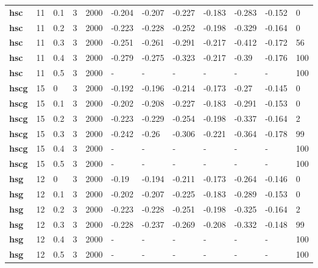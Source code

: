 \begin{longtable}[h]{|p{0.8cm}|p{1.5cm}|p{1cm}|p{1cm}|p{1cm}|p{1cm}|p{1cm}|p{1cm}|p{1cm}|p{1cm}|p{1cm}|p{1.5cm}|}
           \\
  \textbf{hsc } &  11         & 0.1 & 3 & 2000 & -0.204 & -0.207 & -0.227 & -0.183 & -0.283 & -0.152 &   0
           \\
  \textbf{hsc } &  11         & 0.2 & 3 & 2000 & -0.223 & -0.228 & -0.252 & -0.198 & -0.329 & -0.164 &   0
           \\
  \textbf{hsc } &  11         & 0.3 & 3 & 2000 & -0.251 & -0.261 & -0.291 & -0.217 & -0.412 & -0.172 &  56
           \\
  \textbf{hsc } &  11         & 0.4 & 3 & 2000 & -0.279 & -0.275 & -0.323 & -0.217 &  -0.39 & -0.176 & 100
           \\
  \textbf{hsc } &  11         & 0.5 & 3 & 2000 & - & - & - & - & - & - & 100
           \\
  \textbf{hscg} &  15         &   0 & 3 & 2000 & -0.192 & -0.196 & -0.214 & -0.173 &  -0.27 & -0.145 &   0
           \\
  \textbf{hscg} &  15         & 0.1 & 3 & 2000 & -0.202 & -0.208 & -0.227 & -0.183 & -0.291 & -0.153 &   0
           \\
  \textbf{hscg} &  15         & 0.2 & 3 & 2000 & -0.223 & -0.229 & -0.254 & -0.198 & -0.337 & -0.164 &   2
           \\
  \textbf{hscg} &  15         & 0.3 & 3 & 2000 & -0.242 &  -0.26 & -0.306 & -0.221 & -0.364 & -0.178 &  99
           \\
  \textbf{hscg} &  15         & 0.4 & 3 & 2000 & - & - & - & - & - & - & 100
           \\
  \textbf{hscg} &  15         & 0.5 & 3 & 2000 & - & - & - & - & - & - & 100
           \\
  \textbf{hsg } &  12         &   0 & 3 & 2000 &  -0.19 & -0.194 & -0.211 & -0.173 & -0.264 & -0.146 &   0
           \\
  \textbf{hsg } &  12         & 0.1 & 3 & 2000 & -0.202 & -0.207 & -0.225 & -0.183 & -0.289 & -0.153 &   0
           \\
  \textbf{hsg } &  12         & 0.2 & 3 & 2000 & -0.223 & -0.228 & -0.251 & -0.198 & -0.325 & -0.164 &   2
           \\
  \textbf{hsg } &  12         & 0.3 & 3 & 2000 & -0.228 & -0.237 & -0.269 & -0.208 & -0.332 & -0.148 &  99
           \\
  \textbf{hsg } &  12         & 0.4 & 3 & 2000 & - & - & - & - & - & - & 100
           \\
  \textbf{hsg } &  12         & 0.5 & 3 & 2000 & - & - & - & - & - & - & 100
           \\
 \end{longtable}
